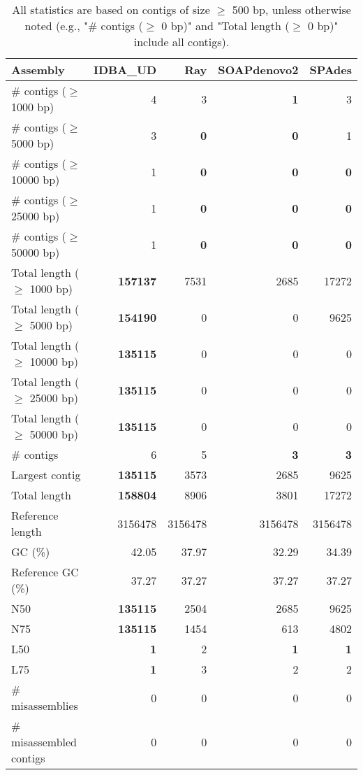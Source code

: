 \documentclass[12pt,a4paper]{article}
\begin{document}
\begin{table}[ht]
\begin{center}
\caption{All statistics are based on contigs of size $\geq$ 500 bp, unless otherwise noted (e.g., "\# contigs ($\geq$ 0 bp)" and "Total length ($\geq$ 0 bp)" include all contigs).}
\begin{tabular}{|l*{4}{|r}|}
\hline
Assembly & IDBA\_UD & Ray & SOAPdenovo2 & SPAdes \\ \hline
\# contigs ($\geq$ 1000 bp) & 4 & 3 & {\bf 1} & 3 \\ \hline
\# contigs ($\geq$ 5000 bp) & 3 & {\bf 0} & {\bf 0} & 1 \\ \hline
\# contigs ($\geq$ 10000 bp) & 1 & {\bf 0} & {\bf 0} & {\bf 0} \\ \hline
\# contigs ($\geq$ 25000 bp) & 1 & {\bf 0} & {\bf 0} & {\bf 0} \\ \hline
\# contigs ($\geq$ 50000 bp) & 1 & {\bf 0} & {\bf 0} & {\bf 0} \\ \hline
Total length ($\geq$ 1000 bp) & {\bf 157137} & 7531 & 2685 & 17272 \\ \hline
Total length ($\geq$ 5000 bp) & {\bf 154190} & 0 & 0 & 9625 \\ \hline
Total length ($\geq$ 10000 bp) & {\bf 135115} & 0 & 0 & 0 \\ \hline
Total length ($\geq$ 25000 bp) & {\bf 135115} & 0 & 0 & 0 \\ \hline
Total length ($\geq$ 50000 bp) & {\bf 135115} & 0 & 0 & 0 \\ \hline
\# contigs & 6 & 5 & {\bf 3} & {\bf 3} \\ \hline
Largest contig & {\bf 135115} & 3573 & 2685 & 9625 \\ \hline
Total length & {\bf 158804} & 8906 & 3801 & 17272 \\ \hline
Reference length & 3156478 & 3156478 & 3156478 & 3156478 \\ \hline
GC (\%) & 42.05 & 37.97 & 32.29 & 34.39 \\ \hline
Reference GC (\%) & 37.27 & 37.27 & 37.27 & 37.27 \\ \hline
N50 & {\bf 135115} & 2504 & 2685 & 9625 \\ \hline
N75 & {\bf 135115} & 1454 & 613 & 4802 \\ \hline
L50 & {\bf 1} & 2 & {\bf 1} & {\bf 1} \\ \hline
L75 & {\bf 1} & 3 & 2 & 2 \\ \hline
\# misassemblies & 0 & 0 & 0 & 0 \\ \hline
\# misassembled contigs & 0 & 0 & 0 & 0 \\ \hline

\end{tabular}
\end{center}
\end{table}
\end{document}
